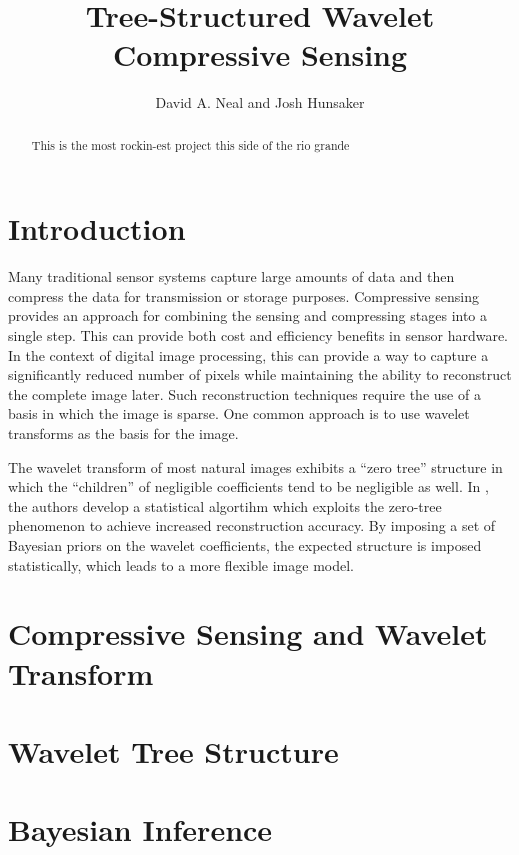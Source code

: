 \documentclass{IEEEtran}
\title{Tree-Structured Wavelet Compressive Sensing}
\author{David A. Neal and  Josh Hunsaker}
\begin{document}
\maketitle

\begin{abstract}
This is the most rockin-est project this side of the rio grande
\end{abstract}

\section{Introduction}

Many traditional sensor systems capture large amounts of data and then compress the data for transmission or storage purposes.  Compressive sensing provides an approach for combining the sensing and compressing stages into a single step.  This can provide both cost and efficiency benefits in sensor hardware. In the context of digital image processing, this can provide a way to capture a significantly reduced number of pixels while maintaining the ability to reconstruct the complete image later. Such reconstruction techniques require the use of a basis in which the image is sparse. One common approach is to use wavelet transforms as the basis for the image.

The wavelet transform of most natural images exhibits a ``zero tree'' structure in which the ``children'' of negligible coefficients tend to be negligible as well. In \cite{He09}, the authors develop a statistical algortihm which exploits the zero-tree phenomenon to achieve increased reconstruction accuracy. By imposing a set of Bayesian priors on the wavelet coefficients, the expected structure is imposed statistically, which leads to a more flexible image model.

\section{Compressive Sensing and Wavelet Transform}

\section{Wavelet Tree Structure}

\section{Bayesian Inference}



\end{document}
